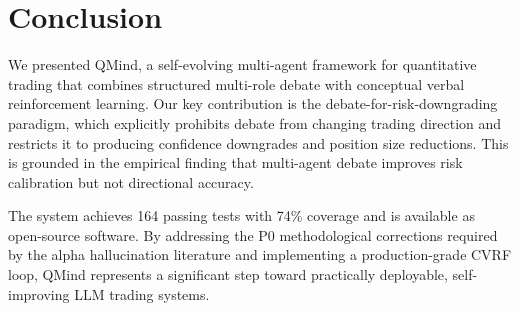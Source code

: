 \documentclass[twocolumn]{article}
\begin{document}
\section{Conclusion}

We presented QMind, a self-evolving multi-agent framework for quantitative trading that combines structured multi-role debate with conceptual verbal reinforcement learning. Our key contribution is the debate-for-risk-downgrading paradigm, which explicitly prohibits debate from changing trading direction and restricts it to producing confidence downgrades and position size reductions. This is grounded in the empirical finding that multi-agent debate improves risk calibration but not directional accuracy.

The system achieves 164 passing tests with 74\% coverage and is available as open-source software. By addressing the P0 methodological corrections required by the alpha hallucination literature\cite{ye2026alpha} and implementing a production-grade CVRF loop, QMind represents a significant step toward practically deployable, self-improving LLM trading systems.
\end{document}
